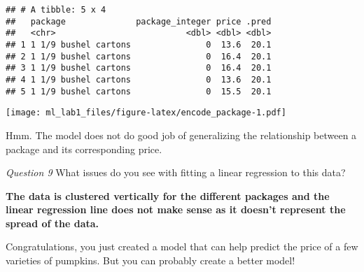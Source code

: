 \documentclass[
]{article}
\begin{document}
\begin{verbatim}
## # A tibble: 5 x 4
##   package              package_integer price .pred
##   <chr>                          <dbl> <dbl> <dbl>
## 1 1 1/9 bushel cartons               0  13.6  20.1
## 2 1 1/9 bushel cartons               0  16.4  20.1
## 3 1 1/9 bushel cartons               0  16.4  20.1
## 4 1 1/9 bushel cartons               0  13.6  20.1
## 5 1 1/9 bushel cartons               0  15.5  20.1
\end{verbatim}

\texttt{[image: ml\_lab1\_files/figure-latex/encode\_package-1.pdf]}

Hmm. The model does not do good job of generalizing the relationship
between a package and its corresponding price.

\emph{Question 9} What issues do you see with fitting a linear
regression to this data?

\textbf{The data is clustered vertically for the different packages and
the linear regression line does not make sense as it doesn't represent
the spread of the data.}

Congratulations, you just created a model that can help predict the
price of a few varieties of pumpkins. But you can probably create a
better model!
\end{document}
